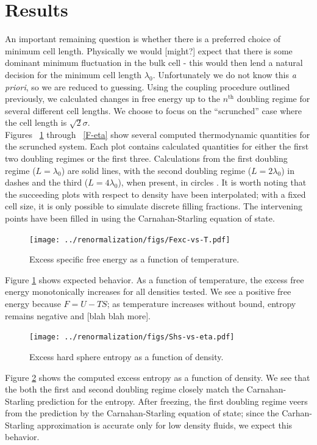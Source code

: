 \documentclass[12pt]{article}
\newcommand{\ignore}[1]{}
\begin{document}
\section{Results}
An important remaining question is whether there is a preferred choice of minimum cell length. Physically we would [might?] expect that there is some dominant minimum fluctuation in the bulk cell - this would then lend a natural decision for the minimum cell length $\lambda_0$. Unfortunately we do not know this {\it a priori}, so we are reduced to guessing. Using the coupling procedure outlined previously, we calculated changes in free energy up to the $n^{\text{th}}$ doubling regime for several different cell lengths. We choose to focus on the ``scrunched'' case where the cell length is $\sqrt2\sigma$.\\

Figures ~\ref{F-T} through ~\ref{F-eta} show several computed thermodynamic quantities for the scrunched system. Each plot contains calculated quantities for either the first two doubling regimes or the first three. Calculations from the first doubling regime ($L=\lambda_0$) are solid lines, with the second doubling regime ($L = 2\lambda_0$) in dashes and the third ($L = 4\lambda_0$), when present, in circles . It is worth noting that the succeeding plots with respect to density have been interpolated; with a fixed cell size, it is only possible to simulate discrete filling fractions. The intervening points have been filled in using the Carnahan-Starling equation of state.\\  
\begin{figure}  
\centering
    \texttt{[image: ../renormalization/figs/Fexc-vs-T.pdf]}
    \caption{Excess specific free energy as a function of temperature.}
    \label{F-T}
\end{figure}

Figure \ref{F-T} shows expected behavior. As a function of temperature, the excess free energy monotonically increases for all densities tested. We see a positive free energy because $F = U -TS$; as temperature increases without bound, entropy remains negative and [blah blah more].\\

\begin{figure}
\centering
    \texttt{[image: ../renormalization/figs/Shs-vs-eta.pdf]}
    \caption{Excess hard sphere entropy as a function of density.}
    \label{Shs-eta}
\end{figure}
\ignore{Filling fraction or density? Value in distinction? We never use number density for the sake of units...}
Figure \ref{Shs-eta} shows the computed excess entropy as a function of density. We see that the both the first and second doubling regime closely match the Carnahan-Starling prediction for the entropy. After freezing, the first doubling regime veers from the prediction by the Carnahan-Starling equation of state; since the Carhan-Starling approximation is accurate only for low density fluids, we expect this behavior.\\
\end{document}
